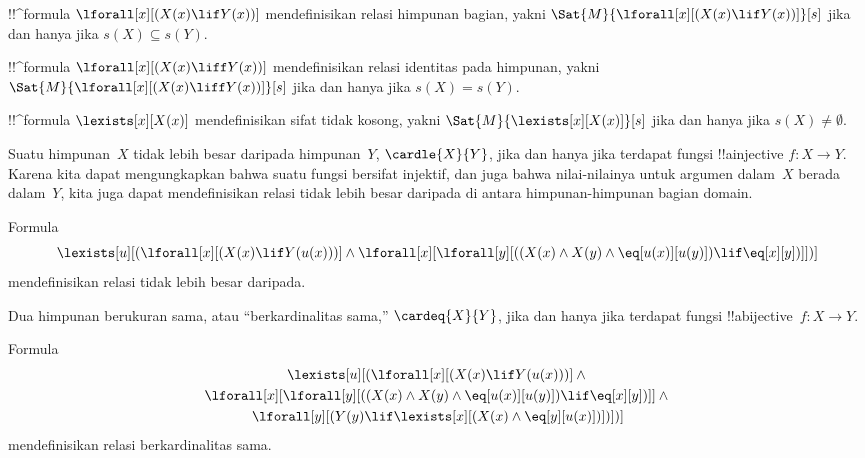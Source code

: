 \documentclass[../../../include/open-logic-section]{subfiles}
\begin{document}


\begin{prop}
!!^{formula} $\lforall[x][(X(x) \lif Y(x))]$ mendefinisikan relasi himpunan
bagian, yakni $\Sat{M}{\lforall[x][(X(x) \lif Y(x))]}[s]$ jika dan hanya jika
$s(X) \subseteq s(Y)$.
\end{prop}

\begin{prop}
!!^{formula} $\lforall[x][(X(x) \liff Y(x))]$ mendefinisikan relasi identitas
pada himpunan, yakni $\Sat{M}{\lforall[x][(X(x) \liff Y(x))]}[s]$ jika dan
hanya jika $s(X) = s(Y)$.
\end{prop}

\begin{prop}
!!^{formula} $\lexists[x][X(x)]$ mendefinisikan sifat tidak kosong, yakni
$\Sat{M}{\lexists[x][X(x)]}[s]$ jika dan hanya jika $s(X) \neq
\emptyset$.
\end{prop}

Suatu himpunan~$X$ tidak lebih besar daripada himpunan~$Y$,
$\cardle{X}{Y}$, jika dan hanya jika terdapat fungsi !!a{injective}
$f\colon X \to Y$. Karena kita dapat mengungkapkan bahwa suatu fungsi
bersifat injektif, dan juga bahwa nilai-nilainya untuk argumen dalam~$X$
berada dalam~$Y$, kita juga dapat mendefinisikan relasi tidak lebih besar
daripada di antara himpunan-himpunan bagian domain.

\begin{prop}
Formula
\[
\lexists[u][(\lforall[x][(X(x) \lif Y(u(x)))] \land
  \lforall[x][\lforall[y][((X(x) \land X(y) \land
    \eq[u(x)][u(y)]) \lif \eq[x][y])]])]
\]
mendefinisikan relasi tidak lebih besar daripada.
\end{prop}

Dua himpunan berukuran sama, atau ``berkardinalitas sama,''
$\cardeq{X}{Y}$, jika dan hanya jika terdapat fungsi
!!a{bijective}~$f\colon X \to Y$.

\begin{prop}
Formula
\begin{multline*}
  \lexists[u][(\lforall[x][(X(x) \lif Y(u(x)))] \land {}\\
    \lforall[x][\lforall[y][((X(x) \land X(y) \land
      \eq[u(x)][u(y)]) \lif \eq[x][y])]]
  \land {} \\\lforall[y][(Y(y) \lif \lexists[x][(X(x)
      \land \eq[y][u(x)])])])]
\end{multline*}
mendefinisikan relasi berkardinalitas sama.
\end{prop}
\end{document}
